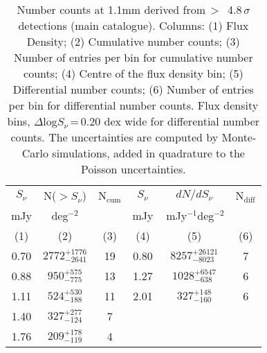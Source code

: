 \documentclass[longauth]{aa}
\begin{document}
\begin{table}
\centering          
\begin{tabular}{c c c | c c c}  
\hline
$S_\nu$ &N($>S_\nu$) & N$_{\text{cum}}$ & $S_\nu$& $dN/dS_\nu$  & N$_{\text{diff}}$ \\
mJy & deg$^{-2}$ & &mJy&\,mJy$^{-1}$deg$^{-2}$ & \\
(1)&(2)&(3)&(4)&(5)&(6)\\
\hline    
\hline    
 0.70 & $2772_{-2641}^{+1776}$	&	19 	&   0.80 	& $8257_{-8023}^{+26121}$ 	&    7\\
 0.88 & $950_{-775}^{+575}$ 		&  	13 	&   1.27 	& $1028_{- 638}^{+6547} $	&    6\\
 1.11 & $524_{-188}^{+ 530}$ 		&  	11 	&   2.01 	&  $327_{- 160}^{+ 148}$ 		&    6\\
 1.40 &$327_{-124}^{+277}$		&	7	& 		& 						& 	\\
 1.76 &$209_{-119}^{+178}$		&	4	& 		& 						& 	\\
\hline 
   \end{tabular}
\caption{Number counts at 1.1mm derived from\,$>$\, 4.8\,$\sigma$ detections (main catalogue). Columns: (1) Flux Density; (2) Cumulative number counts; (3) Number of entries per bin for cumulative number counts; (4) Centre of the flux density bin; (5) Differential number counts; (6) Number of entries per bin for differential number counts. Flux density bins, $\Delta$log$S_\nu$\,=\,0.20 dex wide for differential number counts. The uncertainties are computed by Monte-Carlo simulations, added in quadrature to the Poisson uncertainties.}
\label{Table_count}    
\end{table}
\end{document}
